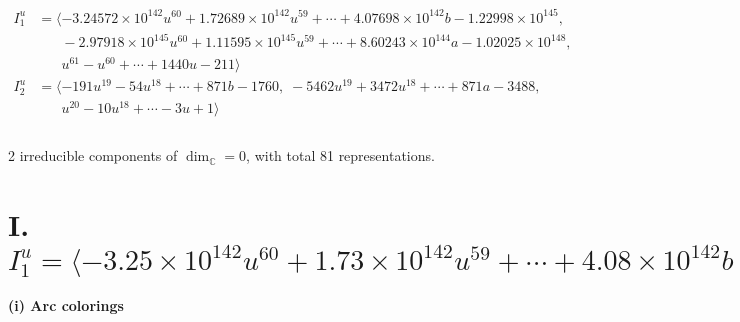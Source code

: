\documentclass[1p]{elsarticle_modified}
\theoremstyle{definition}
\begin{document}
\begin{align*}
I^u_{1}&=\langle 
-3.24572\times10^{142} u^{60}+1.72689\times10^{142} u^{59}+\cdots+4.07698\times10^{142} b-1.22998\times10^{145},\\
\phantom{I^u_{1}}&\phantom{= \langle  }-2.97918\times10^{145} u^{60}+1.11595\times10^{145} u^{59}+\cdots+8.60243\times10^{144} a-1.02025\times10^{148},\\
\phantom{I^u_{1}}&\phantom{= \langle  }u^{61}- u^{60}+\cdots+1440 u-211\rangle \\
I^u_{2}&=\langle 
-191 u^{19}-54 u^{18}+\cdots+871 b-1760,\;-5462 u^{19}+3472 u^{18}+\cdots+871 a-3488,\\
\phantom{I^u_{2}}&\phantom{= \langle  }u^{20}-10 u^{18}+\cdots-3 u+1\rangle \\
\\
\end{align*}
\raggedright * 2 irreducible components of $\dim_{\mathbb{C}}=0$, with total 81 representations.\\
\newpage
\renewcommand{\arraystretch}{1}
\centering \section*{I. $I^u_{1}= \langle -3.25\times10^{142} u^{60}+1.73\times10^{142} u^{59}+\cdots+4.08\times10^{142} b-1.23\times10^{145},\;-2.98\times10^{145} u^{60}+1.12\times10^{145} u^{59}+\cdots+8.60\times10^{144} a-1.02\times10^{148},\;u^{61}- u^{60}+\cdots+1440 u-211 \rangle$}
\flushleft \textbf{(i) Arc colorings}\\
\end{document}
